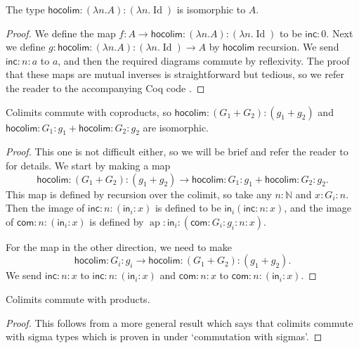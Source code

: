 \documentclass[a4paper,UKenglish]{lipics-v2016}
\newcommand{\Boperator}[1]{\mathsf{#1}}
\newcommand{\inn}{\Boperator{in}}
\newcommand{\ap}[0]{\operatorname{ap}}
\newcommand{\hocolim}[0]{\Boperator{hocolim}}
\newcommand{\inc}[0]{\Boperator{inc}}
\newcommand{\com}[0]{\Boperator{com}}
\begin{document}
\begin{lemma}
\label{lem:colimcon}
The type $\hocolim : (\lambda n . A) : (\lambda n . \operatorname{Id})$ is isomorphic to $A$.
\end{lemma}

\begin{proof}
We define the map $f : A \rightarrow \hocolim : (\lambda n . A) : (\lambda n . \operatorname{Id})$
to be $\inc : 0$.
Next we define $g : \hocolim : (\lambda n . A) : (\lambda n . \operatorname{Id}) \rightarrow A$ by $\hocolim$ recursion.
We send $\inc : n : a$ to $a$, and then the required diagrams commute by reflexivity.
The proof that these maps are mutual inverses is straightforward but tedious, so we refer the reader to the accompanying Coq code \cite{CoqImpl}.
\end{proof}

\begin{lemma}
\label{lem:colimsum}
Colimits commute with coproducts, so $\hocolim : (G_1 + G_2) : (g_1 + g_2)$ and $\hocolim : G_1 : g_1 + \hocolim : G_2 : g_2$ are isomorphic.
\end{lemma}

\begin{proof}
This one is not difficult either, so we will be brief and refer the reader to \cite{CoqImpl} for details.
We start by making a map 
\[
\hocolim : (G_1+G_2) : (g_1 + g_2) \rightarrow \hocolim : G_1 : g_1 + \hocolim : G_2 : g_2.
\]
This map is defined by recursion over the colimit, so take any $n : \mathbb{N}$ and $x : G_i : n$.
Then the image of $\inc : n : (\inn_i : x)$ is defined to be $\inn_i (\inc : n : x)$, and the image of $\com : n : (\inn_i : x)$ is defined by
$\ap : \inn_i : (\com : G_i : g_i : n : x)$.

For the map in the other direction, we need to make 
\[
\hocolim : G_i : g_i \rightarrow \hocolim : (G_1 + G_2) : (g_1 + g_2).
\]
We send $\inc : n : x$ to $\inc : n : (\inn_i : x)$ and $\com : n : x$ to $\com : n : (\inn_i : x)$.
\end{proof}

\begin{lemma}
\label{lem:colimprod}
Colimits commute with products.
\end{lemma}

\begin{proof}
This follows from a more general result which says that colimits commute with sigma types which is proven in \cite{boulier2015colimites,boulier2016} under `commutation with sigmas'.
\end{proof}
\end{document}
